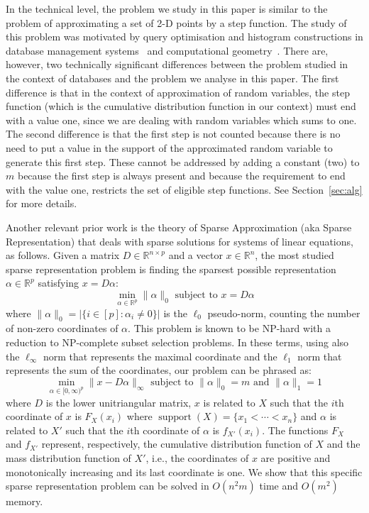 \documentclass[letterpaper]{article} %
\DeclareMathOperator{\support}{support}
\begin{document}
In the technical level, the problem we study in this paper is similar to the problem of approximating a set of 2-D points by a step function. The study of this problem was motivated by query optimisation and histogram constructions in database management systems~\cite{applf12,applf13,applf14,applf17,applf18,Fournier2011} and computational geometry~\cite{diaz2001fitting,fournier2008fitting}. There are, however, two technically significant differences between the problem studied in the context of databases and the problem we analyse in this paper. The first difference is that in the context of approximation of random variables, the step function (which is the cumulative distribution function in our context)  must end with a value one, since we are dealing with random variables which sums to one. The second difference is that the first step is not counted because there is no need to put a value in the support of the approximated random variable to generate this first step. These cannot be addressed by adding a constant (two) to $m$ because the first step is always present and because the requirement to end with the value one, restricts the set of eligible step functions. See Section~\ref{sec:alg} for more details.

Another relevant prior work is the theory of Sparse Approximation (aka Sparse Representation) that deals with sparse solutions for systems of linear equations, as follows. 
Given a matrix $D \in \mathbb{R}^{n \times p}$ and a vector $x \in \mathbb{R}^n$, the most studied sparse representation problem is finding the sparsest possible representation $\alpha \in \mathbb{R}^p$ satisfying $x = D\alpha$:
\[
\min_{\alpha \in \mathbb{R}^p} \|\alpha\|_0 \text{ subject to } x = D\alpha
\]
where $\|\alpha\|_0 = |\{ i \in [p]: \alpha_i \neq 0 \}|$ is the $\ell_0$ pseudo-norm, counting the number of non-zero coordinates of $\alpha$. This problem is known to be NP-hard with a reduction to NP-complete subset selection problems.
In these terms, using also the $\ell_\infty$ norm that represents the maximal coordinate and the $\ell_1$ norm that represents the sum of the coordinates, our problem can be phrased as:
\[
\min_{\alpha \in [0,\infty)^p}\|x - D\alpha\|_{\infty} \text{ subject to }  \|\alpha\|_0 = m \text{ and } \|\alpha\|_1=1
\]
where $D$ is the lower unitriangular matrix, $x$ is related to $X$ such that the $i$th coordinate of $x$ is $F_X(x_i)$ where $\support(X)=\{x_1 < \cdots < x_n\}$ and $\alpha$ is related to $X'$ such that the $i$th coordinate of $\alpha$ is $f_{X'}(x_i)$. The functions $F_X$ and $f_{X'}$ represent, respectively, the cumulative distribution function of $X$ and the mass distribution function of $X'$, i.e.,  the coordinates of $x$ are positive and monotonically increasing and its last coordinate is one. We show that this specific sparse representation problem can be solved in $O(n^2m)$ time and $O(m^2)$ memory.
\end{document}
